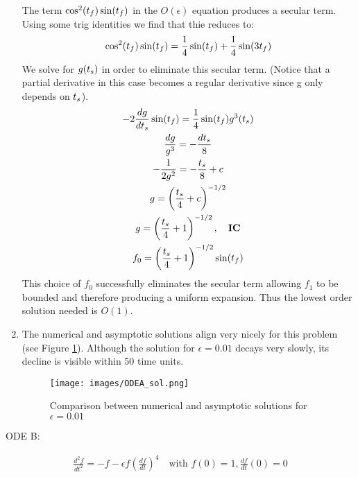 \documentclass{article}
\begin{document}
\begin{enumerate}[label=\alph*.]
    The term $\cos^2(t_f)\sin(t_f)$ in the $O(\epsilon)$ equation produces a
    secular term. Using some trig identities we find that thie reduces to:
    \begin{gather*}
        \cos^2(t_f)\sin(t_f) = \frac{1}{4}\sin(t_f) + \frac{1}{4}\sin(3t_f)
    \end{gather*}
    We solve for $g(t_s)$ in order to eliminate this secular term. (Notice that
    a partial derivative in this case becomes a regular derivative since g only
    depends on $t_s$). 
    \begin{gather*}
        -2\frac{dg}{dt_s}\sin(t_f) = \frac{1}{4}\sin(t_f)g^3(t_s)\\
        \frac{dg}{g^3} = -\frac{dt_s}{8}\\
        -\frac{1}{2g^2} = -\frac{t_s}{8} + c\\
        g = \left(\frac{t_s}{4} + c\right)^{-1/2}\\
        g = \left(\frac{t_s}{4} + 1\right)^{-1/2}, \quad \textbf{IC}\\
        f_0 = \left(\frac{t_s}{4} + 1\right)^{-1/2}\sin(t_f)
    \end{gather*}
    This choice of $f_0$ successfully eliminates the secular term allowing $f_1$
    to be bounded and therefore producing a uniform expansion. Thus the lowest
    order solution needed is $O(1)$. 
    \item The numerical and asymptotic solutions align very nicely for this
    problem (see Figure \ref{fig:ODEA_comp}). Although the solution for
    $\epsilon = 0.01$ decays very slowly, its decline is visible within 50 time
    units. 
        \begin{figure}[ht]
            \centering
            \texttt{[image: images/ODEA\_sol.png]}
            \caption{Comparison between numerical and asymptotic solutions for
            $\epsilon = 0.01$}
            \label{fig:ODEA_comp}
        \end{figure}
    
\end{enumerate}

\vspace{20pt}

ODE B: 

\begin{gather*}
    \frac{d^2f}{dt^2} = -f - \epsilon f \left(\frac{df}{dt}\right)^4 \quad
    \text{with } f(0) = 1, \frac{df}{dt}(0) = 0
\end{gather*}
\end{document}
